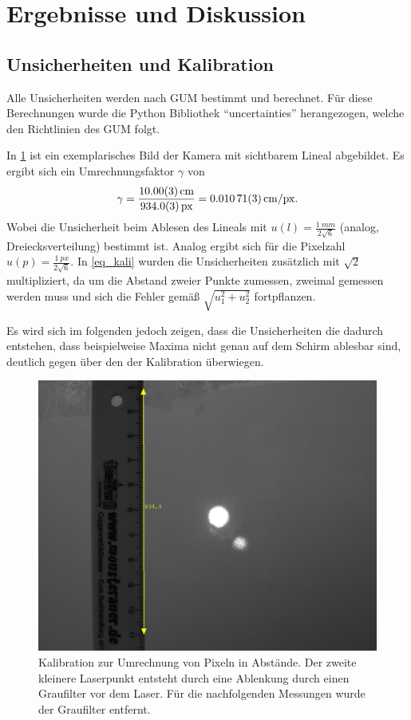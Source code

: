 \documentclass[
	a4paper,
	12pt,
	pagesize,
	ngerman
]{scrartcl}
\begin{document}
	\section{Ergebnisse und Diskussion}

	\subsection{Unsicherheiten und Kalibration}
	Alle Unsicherheiten werden nach GUM bestimmt und berechnet.
	Für diese Berechnungen wurde die Python Bibliothek \enquote{uncertainties} herangezogen, welche den Richtlinien des GUM folgt.

	In \cref{fig_kalibration} ist ein exemplarisches Bild der Kamera mit sichtbarem Lineal abgebildet.
	Es ergibt sich ein Umrechnungsfaktor $\gamma$ von
	\begin{equation}
			\label{eq_kali}
			\gamma = \frac{\SI{10.0+-0.03}{cm}}{\SI{934+-0.3}{px}}=\SI{0.01071+-0.00003}{cm/px}.
	\end{equation}
	Wobei die Unsicherheit beim Ablesen des Lineals mit $u(l)=\frac{\SI{1}{mm}}{2\sqrt{6}}$ (analog, Dreiecksverteilung) bestimmt ist.
	Analog ergibt sich für die Pixelzahl $u(p)=\frac{\SI{1}{px}}{2\sqrt{6}}$.
	In \cref{eq_kali} wurden die Unsicherheiten zusätzlich mit $\sqrt{2}$ multipliziert, da um die Abstand zweier Punkte zumessen, zweimal gemessen werden muss und sich die Fehler gemäß $\sqrt{u_1^2+u_2^2}$ fortpflanzen.

	Es wird sich im folgenden jedoch zeigen, dass die Unsicherheiten die dadurch entstehen, dass beispielweise Maxima nicht genau auf dem Schirm ablesbar sind, deutlich gegen über den der Kalibration überwiegen. %


	\begin{figure}[H]
		\includegraphics[width=0.7\linewidth]{raw/0/0_kalibration.png}
					\caption{
						Kalibration zur Umrechnung von Pixeln in Abstände.
						Der zweite kleinere Laserpunkt entsteht durch eine Ablenkung durch einen Graufilter vor dem Laser.
						Für die nachfolgenden Messungen wurde der Graufilter entfernt.
					}
					\label{fig_kalibration}
			\end{figure}
\end{document}

